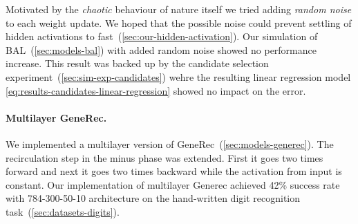 Motivated by the \emph{chaotic} behaviour of nature itself we tried adding \emph{random noise} to each weight update. We hoped that the possible noise could prevent settling of hidden activations to fast~(\ref{sec:our-hidden-activation}). Our simulation of BAL~(\ref{sec:models-bal}) with added random noise showed no performance increase. This result was backed up by the candidate selection experiment~(\ref{sec:sim-exp-candidates}) wehre the resulting linear regression model \ref{eq:results-candidates-linear-regression} showed no impact on the error. 

\paragraph{Multilayer GeneRec.}

We implemented a multilayer version of GeneRec~(\ref{sec:models-generec}). The recirculation step in the minus phase was extended. First it goes two times forward and next it goes two times backward while the activation from input is constant. Our implementation of multilayer Generec achieved 42\% success rate with 784-300-50-10 architecture on the hand-written digit recognition task~(\ref{sec:datasets-digits}). 
